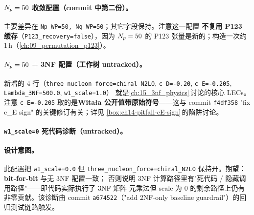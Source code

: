 \paragraph{\(N_p = 50\) 收敛配置（commit 中第二份）。}


主要差异在 \texttt{Np\_WP=50, Nq\_WP=50}；其它字段保持。注意这一配置
\textbf{不复用 P123 缓存}（\texttt{P123\_recovery=false}），因为
\(N_p = 50\) 的 P123 张量是新的；构造一次约 1\,h（\cref{ch:09_permutation_p123}）。

\paragraph{\(N_p = 50\) + 3NF 配置（工作树 untracked）。}


新增的 4 行（\texttt{three\_nucleon\_force=chiral\_N2LO}, \texttt{c\_D=-0.20},
\texttt{c\_E=-0.205}, \texttt{Lambda\_3NF=500.0}, \texttt{w1\_scale=1.0}）
就是\cref{ch:15_3nf_physics}\(\,\)讨论的核心 LECs。注意 \texttt{c\_E=-0.205}
取的是\textbf{Witała 公开值带原始符号}——这与 commit \texttt{f4df358}
"fix c\_E sign" 的关键修订有关；详见
\cref{box:ch14-pitfall-cE-sign}\(\,\)的陷阱讨论。

\paragraph{\texttt{w1\_scale=0} 死代码诊断（untracked）。}


\paragraph{设计意图。}
此配置把 \texttt{w1\_scale=0.0} 但 \texttt{three\_nucleon\_force=chiral\_N2LO}
保持开。期望：\textbf{bit-for-bit} 与无 3NF 配置一致；
否则说明 3NF 计算路径里有"死代码 / 隐藏调用路径"——即代码实际执行了 3NF 矩阵
元乘法但 scale 为 0 的剩余路径上仍有非零贡献。该诊断由 commit
\texttt{a674522}（"add 2NF-only baseline guardrail"）的回归测试链路触发。

